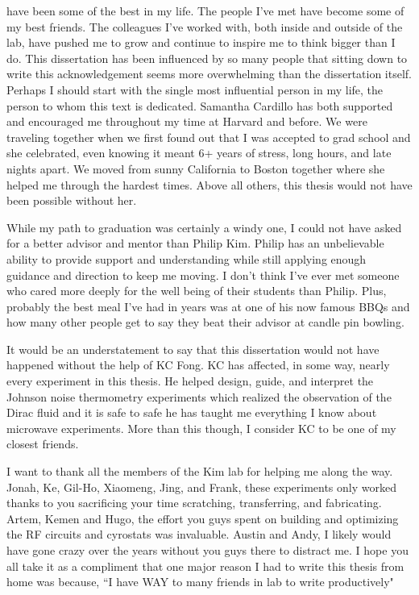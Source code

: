 
 have been some of the best in my life. The people I've met have become some of my best friends. The colleagues I've worked with, both inside and outside of the lab, have pushed me to grow and continue to inspire me to think bigger than I do. This dissertation has been influenced by so many people that sitting down to write this acknowledgement seems more overwhelming than the dissertation itself. Perhaps I should start with the single most influential person in my life, the person to whom this text is dedicated. Samantha Cardillo has both supported and encouraged me throughout my time at Harvard and before. We were traveling together when we first found out that I was accepted to grad school and she celebrated, even knowing it meant 6+ years of stress, long hours, and late nights apart. We moved from sunny California to Boston together where she helped me through the hardest times.  Above all others, this thesis would not have been possible without her. 

While my path to graduation was certainly a windy one, I could not have asked for a better advisor and mentor than Philip Kim. Philip has an unbelievable ability to provide support and understanding while still applying enough guidance and direction to keep me moving. I don't think I've ever met someone who cared more deeply for the well being of their students than Philip. Plus, probably the best meal I've had in years was at one of his now famous BBQs and how many other people get to say they beat their advisor at candle pin bowling.

It would be an understatement to say that this dissertation would not have happened without the help of KC Fong. KC has affected, in some way, nearly every experiment in this thesis. He helped design, guide, and interpret the Johnson noise thermometry experiments which realized the observation of the Dirac fluid and it is safe to safe he has taught me everything I know about microwave experiments. More than this though, I consider KC to be one of my closest friends.

I want to thank all the members of the Kim lab for helping me along the way. Jonah, Ke, Gil-Ho, Xiaomeng, Jing, and Frank, these experiments only worked thanks to you sacrificing your time scratching, transferring, and fabricating. Artem, Kemen and Hugo, the effort you guys spent on building and optimizing the RF circuits and cyrostats was invaluable. Austin and Andy, I likely would have gone crazy over the years without you guys there to distract me. I hope you all take it as a compliment that one major reason I had to write this thesis from home was because, ``I have WAY to many friends in lab to write productively"

